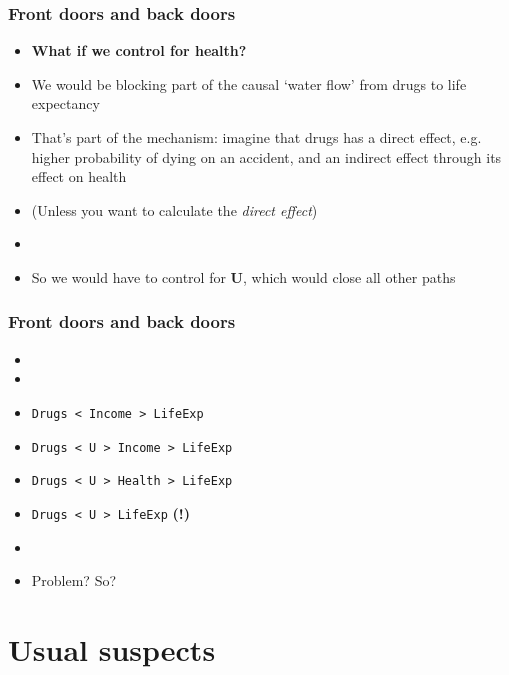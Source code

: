 \documentclass[aspectratio=43]{beamer}
\begin{document}
\begin{frame}
\frametitle{Front doors and back doors}
\centering

\begin{itemize}[<+->]
  \item \textbf{What if we control for health?}
  \item We would be blocking part of the causal `water flow' from drugs to life expectancy
  \item That's part of the mechanism: imagine that drugs has a direct effect, e.g. higher probability of dying on an accident, and an indirect effect through its effect on health
  \item (Unless you want to calculate the \textit{direct effect})
  \item[]
  \item So we would have to control for \textbf{U}, which would close all other paths
\end{itemize}

\end{frame}

\begin{frame}
\frametitle{Front doors and back doors}
\centering

\begin{itemize}
  \item {}
  \item {}
  \item \texttt{Drugs < Income > LifeExp}
  \item \texttt{Drugs < U > Income > LifeExp}
  \item \texttt{Drugs < U > Health > LifeExp}
  \item \texttt{Drugs < U > LifeExp} \textbf{(!)}
  \item[]
  \item Problem? So?
\end{itemize}

\end{frame}

\section{Usual suspects}
\end{document}
